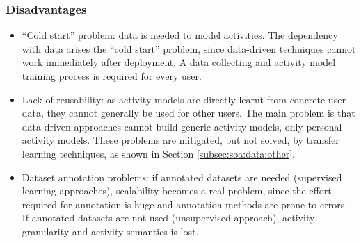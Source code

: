 \subsubsection*{Disadvantages}
\begin{itemize}
 \item ``Cold start'' problem: data is needed to model activities. The dependency with data arises the ``cold start'' problem, since data-driven techniques cannot work immediately after deployment. A data collecting and activity model training process is required for every user.
 \item Lack of reusability: as activity models are directly learnt from concrete user data, they cannot generally be used for other users. The main problem is that data-driven approaches cannot build generic activity models, only personal activity models. These problems are mitigated, but not solved, by transfer learning techniques, as shown in Section \ref{subsec:soa:data:other}.
 \item Dataset annotation problems: if annotated datasets are needed (supervised learning approaches), scalability becomes a real problem, since the effort required for annotation is huge and annotation methods are prone to errors. If annotated datasets are not used (unsupervised approach), activity granularity and activity semantics is lost. 
\end{itemize}

